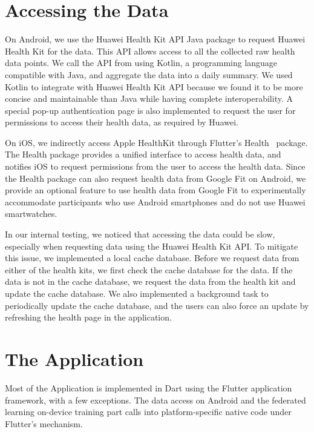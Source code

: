 \section{Accessing the Data}

On Android, we use the Huawei Health Kit API Java package to request
Huawei Health Kit for the data.
This API allows access to all the collected raw health data points.
We call the API from using Kotlin,
a programming language compatible with Java,
and aggregate the data into a daily summary.
We used Kotlin to integrate with Huawei Health Kit API because
we found it to be more concise and maintainable than Java while
having complete interoperability.
A special pop-up authentication page is also implemented to request the user for
permissions to access their health data, as required by Huawei.

On iOS, we indirectly access Apple HealthKit through Flutter's
Health~\cite{flutterhealth} package.
The Health package provides a unified interface to access health data,
and notifies iOS to request permissions from the user to access the health data.
Since the Health package can also request health data from Google Fit on
Android, we provide an optional feature to use health data from Google Fit to
experimentally accommodate participants who use Android smartphones and
do not use Huawei smartwatches.

In our internal testing, we noticed that accessing the data could be slow,
especially when requesting data using the Huawei Health Kit API.
To mitigate this issue, we implemented a local cache database.
Before we request data from either of the health kits,
we first check the cache database for the data.
If the data is not in the cache database,
we request the data from the health kit and update the cache database.
We also implemented a background task to periodically update the cache database,
and the users can also force an update by refreshing the health page in
the application.

\section{The \fedcampus Application}

Most of the \fedcampus Application is implemented in Dart using
the Flutter application framework, with a few exceptions.
The data access on Android and the federated learning on-device training part
calls into platform-specific native code under Flutter's mechanism.

